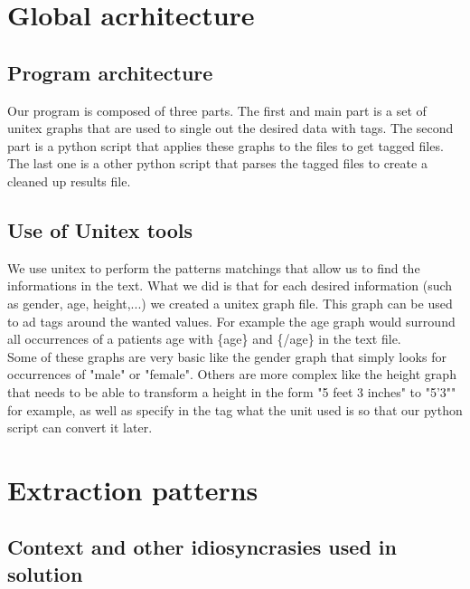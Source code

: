 \documentclass{eplDoc}
\begin{document}
\maketitle
\newpage

\section{Global acrhitecture}

\subsection{Program architecture}

Our program is composed of three parts. The first and main part is a set of unitex graphs that are used to single out the desired data with tags. The second part is a python script that applies these graphs to the files to get tagged files. The last one is a other python script that parses the tagged files to create a cleaned up results file. 

\subsection{Use of Unitex tools}

We use unitex to perform the patterns matchings that allow us to find the informations in the text. What we did is that for each desired information (such as gender, age, height,...) we created a unitex graph file. This graph can be used to ad tags around the wanted values. For example the age graph would surround all occurrences of a patients age with \{age\} and \{/age\} in the text file. \\ 
Some of these graphs are very basic like the gender graph that simply looks for occurrences of "male" or "female". Others are more complex like the height graph that needs to be able to transform a height in the form "5 feet 3 inches" to "5'3"" for example, as well as specify in the tag what the unit used is so that our python script can convert it later. \\ 

\section{Extraction patterns}

\subsection{Context and other idiosyncrasies used in solution}
\end{document}
